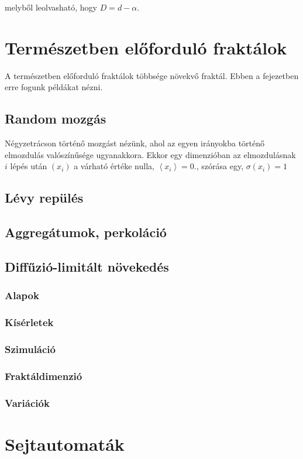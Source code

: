\documentclass[12pt]{article}
\theoremstyle{plain}
\begin{document}
melyből leolvasható, hogy $D = d- \alpha$. 

\section{Természetben előforduló fraktálok}
A természetben előforduló fraktálok többsége növekvő fraktál. Ebben a fejezetben erre fogunk példákat nézni.


\subsection{Random mozgás}
Négyzetrácson történő mozgást nézünk, ahol az egyen irányokba történő elmozdulás valószínűsége ugyanakkora. Ekkor egy dimenzióban az elmozdulásnak $i$ lépés után $(x_i)$ a várható értéke nulla, $\left< x_i\right>  = 0$., szórása egy, $\sigma\left( x_i\right) = 1$


\subsection{Lévy repülés}

\subsection{Aggregátumok, perkoláció}

\subsection{Diffűzió-limitált növekedés}
\subsubsection{Alapok}
\subsubsection{Kísérletek}
\subsubsection{Szimuláció}
\subsubsection{Fraktáldimenzió}
\subsubsection{Variációk}


\section{Sejtautomaták}










\end{document}
